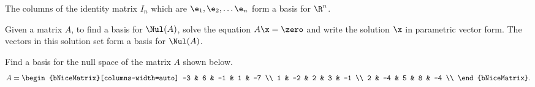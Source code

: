 \begin{example}
  \label{exm:basis}

  The columns of the identity matrix $I_n$ which are $\e_1,\e_2,\dots\e_n$ form
  a basis for $\R^n$.
\end{example}

\begin{purpleframe}
  \label{prpl:basis}

  Given a matrix $A$, to find a basis for $\Nul(A)$, solve the equation $A\x =
  \zero$ and write the solution $\x$ in parametric vector form. The vectors in this
  solution set form a basis for $\Nul(A)$.
\end{purpleframe}

\begin{question}
  \label{qst:basis_for_null_space}

  Find a basis for the null space of the matrix $A$ shown below.
  \[%
    A = \begin{bNiceMatrix}[columns-width=auto]
      -3 & 6 & -1 & 1 & -7 \\
      1 & -2 & 2 & 3 & -1 \\
      2 & -4 & 5 & 8 & -4 \\
    \end{bNiceMatrix}
  .\]%
\end{question}

